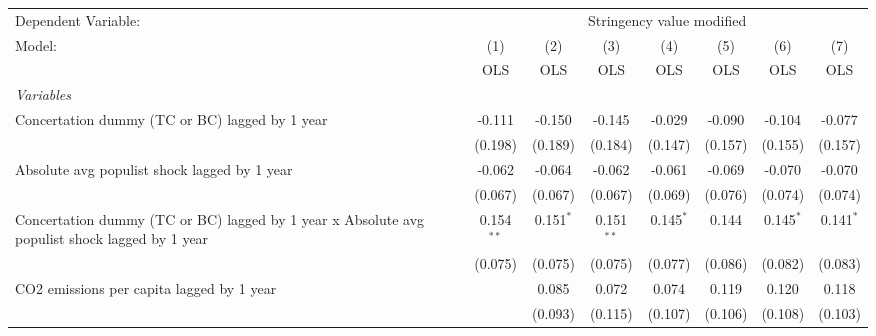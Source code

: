 
\begingroup
\centering
\begin{tabular}{lccccccc}
   \toprule
   Dependent Variable: & \multicolumn{7}{c}{Stringency value modified}\\
   Model:                                                                                        & (1)          & (2)         & (3)          & (4)         & (5)         & (6)         & (7)\\  
                                                                                                 &  OLS         & OLS         & OLS          & OLS         & OLS         & OLS         & OLS\\  
   \midrule
   \emph{Variables}\\
   Concertation dummy (TC or BC) lagged by 1 year                                                & -0.111       & -0.150      & -0.145       & -0.029      & -0.090      & -0.104      & -0.077\\   
                                                                                                 & (0.198)      & (0.189)     & (0.184)      & (0.147)     & (0.157)     & (0.155)     & (0.157)\\   
   Absolute avg populist shock lagged by 1 year                                                  & -0.062       & -0.064      & -0.062       & -0.061      & -0.069      & -0.070      & -0.070\\   
                                                                                                 & (0.067)      & (0.067)     & (0.067)      & (0.069)     & (0.076)     & (0.074)     & (0.074)\\   
   Concertation dummy (TC or BC) lagged by 1 year x Absolute avg populist shock lagged by 1 year & 0.154$^{**}$ & 0.151$^{*}$ & 0.151$^{**}$ & 0.145$^{*}$ & 0.144       & 0.145$^{*}$ & 0.141$^{*}$\\   
                                                                                                 & (0.075)      & (0.075)     & (0.075)      & (0.077)     & (0.086)     & (0.082)     & (0.083)\\   
   CO2 emissions per capita lagged by 1 year                                                     &              & 0.085       & 0.072        & 0.074       & 0.119       & 0.120       & 0.118\\   
                                                                                                 &              & (0.093)     & (0.115)      & (0.107)     & (0.106)     & (0.108)     & (0.103)\\   

\end{tabular}
